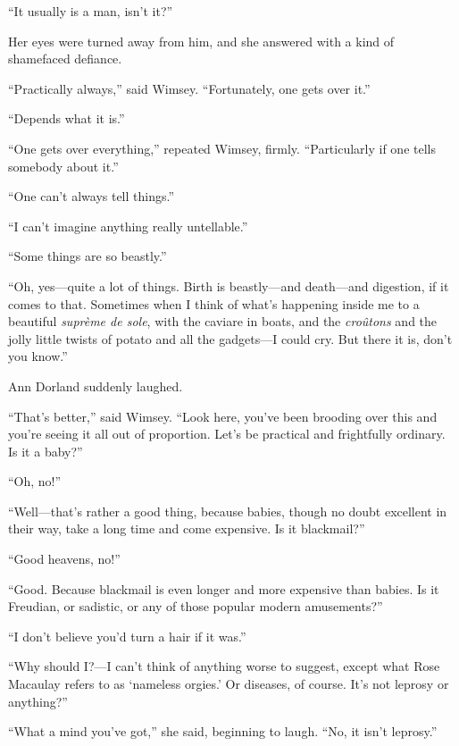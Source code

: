 \enquote{It usually is a man, isn't it?}

Her eyes were turned away from him, and she answered with a kind of shamefaced defiance.

\enquote{Practically always,} said Wimsey. \enquote{Fortunately, one gets over it.}

\enquote{Depends what it is.}

\enquote{One gets over everything,} repeated Wimsey, firmly. \enquote{Particularly if one tells somebody about it.}

\enquote{One can't always tell things.}

\enquote{I can't imagine anything really untellable.}

\enquote{Some things are so beastly.}

\enquote{Oh, yes\allowbreak---\allowbreak quite a lot of things. Birth is beastly\allowbreak---\allowbreak and death\allowbreak---\allowbreak and digestion, if it comes to that. Sometimes when I think of what's happening inside me to a beautiful \textit{suprème de sole}, with the caviare in boats, and the \textit{croûtons} and the jolly little twists of potato and all the gadgets\allowbreak---\allowbreak I could cry. But there it is, don't you know.}

Ann Dorland suddenly laughed.

\enquote{That's better,} said Wimsey. \enquote{Look here, you've been brooding over this and you're seeing it all out of proportion. Let's be practical and frightfully ordinary. Is it a baby?}

\enquote{Oh, no!}

\enquote{Well\allowbreak---\allowbreak that's rather a good thing, because babies, though no doubt excellent in their way, take a long time and come expensive. Is it blackmail?}

\enquote{Good heavens, no!}

\enquote{Good. Because blackmail is even longer and more expensive than babies. Is it Freudian, or sadistic, or any of those popular modern amusements?}

\enquote{I don't believe you'd turn a hair if it was.}

\enquote{Why should I?---I can't think of anything worse to suggest, except what Rose Macaulay refers to as \enquote{nameless orgies.} Or diseases, of course. It's not leprosy or anything?}

\enquote{What a mind you've got,} she said, beginning to laugh. \enquote{No, it isn't leprosy.}

